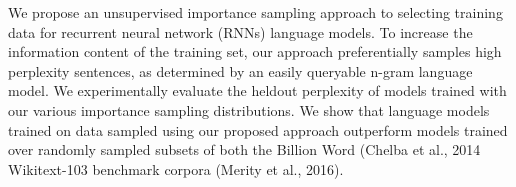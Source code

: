 We propose an unsupervised importance sampling approach to selecting training data for recurrent neural network (RNNs) language models. To increase the information content of the training set, our approach preferentially samples high perplexity sentences, as determined by an easily queryable n-gram language model. We experimentally evaluate the heldout perplexity of models trained with our various importance sampling distributions. We show that language models trained on data sampled using our proposed approach outperform models trained over randomly sampled subsets of both the Billion Word (Chelba et al., 2014 Wikitext-103 benchmark corpora (Merity et al., 2016).
